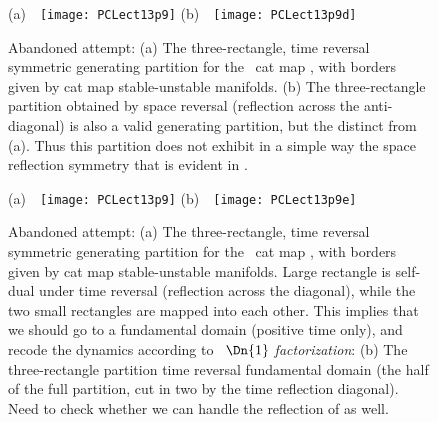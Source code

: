 \begin{description}

\begin{figure}
  \centering
(a)~~\texttt{[image: PCLect13p9]}
(b)~~\texttt{[image: PCLect13p9d]}
  \caption{\label{fig:PCLect13p9d}
Abandoned attempt:
(a) The three-rectangle, time reversal symmetric generating partition for
the \PV\ cat map , with borders given
by cat map stable-unstable manifolds.
(b)
The three-rectangle partition obtained by space reversal (reflection across the
anti-diagonal) is also a valid generating partition, but the distinct from (a).
Thus this partition does not exhibit in a simple way the space reflection
symmetry that is evident in .
}
\end{figure}

\begin{figure}
  \centering
(a)~~\texttt{[image: PCLect13p9]}
(b)~~\texttt{[image: PCLect13p9e]}
  \caption{\label{fig:PCLect13p9e}
Abandoned attempt:
(a) The three-rectangle, time reversal symmetric generating partition for
the \PV\ cat map , with borders given
by cat map stable-unstable manifolds. Large rectangle is self-dual under time
reversal (reflection across the diagonal), while the two small rectangles
are mapped into each other.
This implies that we should go to a fundamental domain (positive time only),
and recode the dynamics according to
~{\em $\Dn{1}$ factorization}:
(b) The three-rectangle partition time reversal fundamental domain (the half of
the full partition, cut in two by the time reflection diagonal). Need to check
whether we can handle the reflection of  as well.
}
\end{figure}



\end{description}
